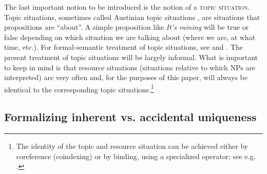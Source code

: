 \documentclass[output=paper,colorlinks,citecolor=brown,newtxmath]{langscibook}
\begin{document}
The last important notion to be introduced is the notion of a \textsc{topic situation}. Topic situations, sometimes called Austinian topic situations \citep{Austin1950}, are situations that propositions are ``about''. A simple proposition like \textit{It's raining} will be true or false depending on which situation we are talking about (where we are, at what time, etc.). For formal-semantic treatment of topic situations, see \citet{Schwarz2009} and \citet{Kratzer2019}. The present treatment of topic situations will be largely informal. What is important to keep in mind is that resource situations (situations relative to which NPs are interpreted) are very often and, for the purposes of this paper, will always be identical to the corresponding topic situations.\footnote{The identity of the topic and resource situation can be achieved either by coreference (coindexing) or by binding, using a specialized operator; see e.g. \citet{Buring2004}.}

\subsection{Formalizing inherent vs. accidental uniqueness}
\end{document}
